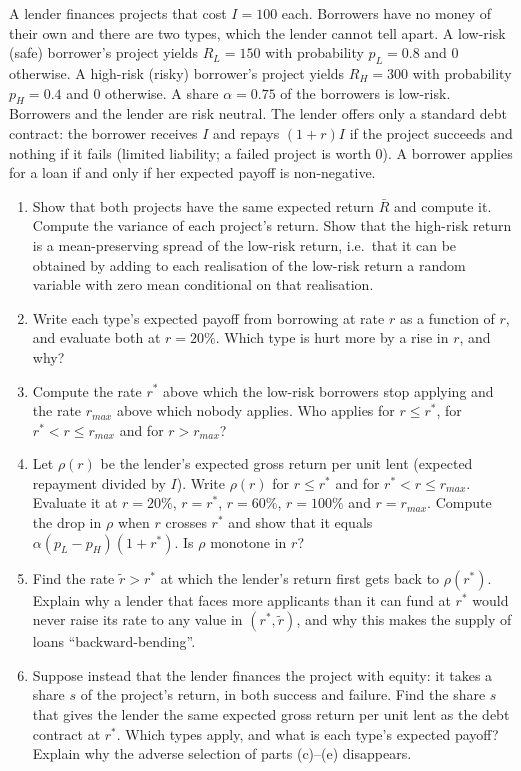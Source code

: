 \documentclass[11pt,a4paper]{article}
\begin{document}
A lender finances projects that cost \(I = 100\) each. Borrowers have no money of their own and
there are two types, which the lender cannot tell apart. A low-risk (safe) borrower's project yields
\(R_L = 150\) with probability \(p_L = 0.8\) and 0 otherwise. A high-risk (risky) borrower's project
yields \(R_H = 300\) with probability \(p_H = 0.4\) and 0 otherwise. A share \(\alpha = 0.75\) of
the borrowers is low-risk. Borrowers and the lender are risk neutral. The lender offers only a
standard debt contract: the borrower receives \(I\) and repays \((1 + r)I\) if the project succeeds
and nothing if it fails (limited liability; a failed project is worth 0). A borrower applies for a
loan if and only if her expected payoff is non-negative.

\begin{enumerate}
\def\labelenumi{(\alph{enumi})}
\item
  Show that both projects have the same expected return \(\bar R\) and compute it. Compute the
  variance of each project's return. Show that the high-risk return is a mean-preserving spread of
  the low-risk return, i.e.~that it can be obtained by adding to each realisation of the low-risk
  return a random variable with zero mean conditional on that realisation.
\item
  Write each type's expected payoff from borrowing at rate \(r\) as a function of \(r\), and
  evaluate both at \(r = 20\%\). Which type is hurt more by a rise in \(r\), and why?
\item
  Compute the rate \(r^*\) above which the low-risk borrowers stop applying and the rate \(r_{max}\)
  above which nobody applies. Who applies for \(r \le r^*\), for \(r^* < r \le r_{max}\) and for
  \(r > r_{max}\)?
\item
  Let \(\rho(r)\) be the lender's expected gross return per unit lent (expected repayment divided by
  \(I\)). Write \(\rho(r)\) for \(r \le r^*\) and for \(r^* < r \le r_{max}\). Evaluate it at
  \(r = 20\%\), \(r = r^*\), \(r = 60\%\), \(r = 100\%\) and \(r = r_{max}\). Compute the drop in
  \(\rho\) when \(r\) crosses \(r^*\) and show that it equals \(\alpha(p_L - p_H)(1 + r^*)\). Is
  \(\rho\) monotone in \(r\)?
\item
  Find the rate \(\tilde r > r^*\) at which the lender's return first gets back to \(\rho(r^*)\).
  Explain why a lender that faces more applicants than it can fund at \(r^*\) would never raise its
  rate to any value in \((r^*, \tilde r)\), and why this makes the supply of loans
  ``backward-bending''.
\item
  Suppose instead that the lender finances the project with equity: it takes a share \(s\) of the
  project's return, in both success and failure. Find the share \(s\) that gives the lender the same
  expected gross return per unit lent as the debt contract at \(r^*\). Which types apply, and what
  is each type's expected payoff? Explain why the adverse selection of parts (c)--(e) disappears.
\end{enumerate}
\end{document}
